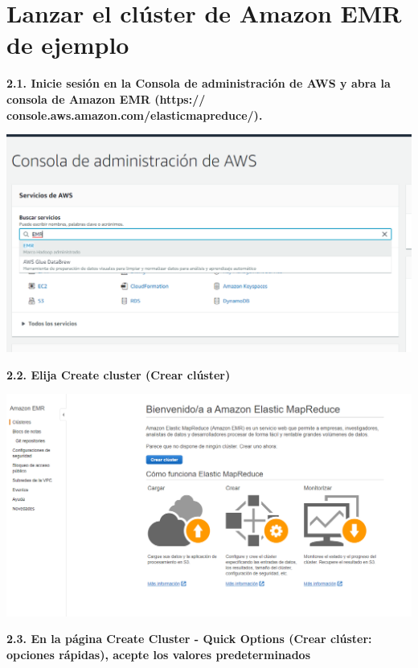 \documentclass{article}
\begin{document}
\section{Lanzar el clúster de Amazon EMR de ejemplo }

\textbf{2.1. Inicie sesión en la Consola de administración de AWS y abra la consola de Amazon EMR (https://
console.aws.amazon.com/elasticmapreduce/). }

    \begin{center}
		\includegraphics[width=15cm]{./images/6} 
	\end{center}
	\newpage
\textbf{2.2. Elija Create cluster (Crear clúster)}

    \begin{center}
		\includegraphics[width=15cm]{./images/7} 
	\end{center}
\newpage
\textbf{2.3. En la página Create Cluster - Quick Options (Crear clúster: opciones rápidas), acepte los valores
predeterminados
}
\end{document}
